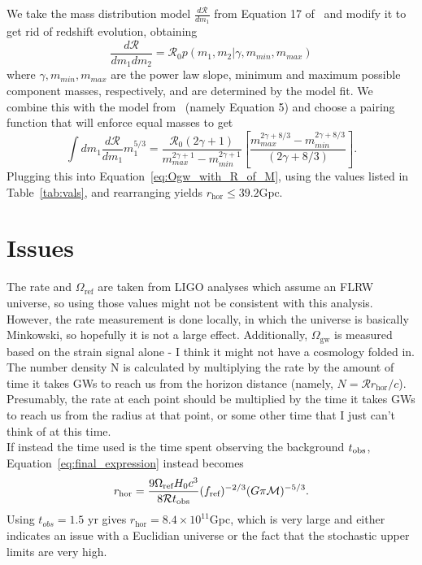 \documentclass[]{article}
\newcommand{\Ogw}{\Omega_{\mathrm{gw}}}
\newcommand{\rhor}{r_{\text{hor}}}
\begin{document}
We take the mass distribution model $\frac{d\mathcal{R}}{dm_1}$ from Equation 17 of~\cite{O2_rates} and modify it to get rid of redshift evolution, obtaining
\begin{equation*}
\frac{d\mathcal{R}}{dm_1 dm_2} = \mathcal{R}_0 p(m_1, m_2 | \gamma, m_{min},m_{max})
\end{equation*}
where $\gamma, m_{min}, m_{max}$ are the power law slope, minimum and maximum possible component masses, respectively, and are determined by the model fit.
We combine this with the model from~\cite{picky_partners} (namely Equation 5) and choose a pairing function that will enforce equal masses to get
\begin{equation*}
\int d m_1 \frac{d\mathcal{R}}{dm_1} m_1 ^{5/3} = \frac{\mathcal{R}_0 (2\gamma +1)}{m_{max}^{2\gamma +1} - m_{min}^{2\gamma +1}} [\frac{m_{max}^{2\gamma +8/3} - m_{min}^{2\gamma +8/3}}{(2\gamma +8/3)}] . 
\end{equation*}
Plugging this into Equation~\ref{eq:Ogw_with_R_of_M}, using the values listed in Table~\ref{tab:vals}, and rearranging yields $\boxed{\rhor \leq 39.2 \mathrm{Gpc}}$. 


\section{Issues}
The rate and $\Omega_{\text{ref}}$ are taken from LIGO analyses which assume an FLRW universe, so using those values might not be consistent with this analysis. 
However, the rate measurement is done locally, in which the universe is basically Minkowski, so hopefully it is not a large effect. 
Additionally, $\Ogw$ is measured based on the strain signal alone - I think it might not have a cosmology folded in.\\

The number density N is calculated by multiplying the rate by the amount of time it takes GWs to reach us from the horizon distance (namely, $N = \mathcal{R} r_{\text{hor}}/c$). Presumably, the rate at each point should be multiplied by the time it takes GWs to reach us from the radius at that point, or some other time that I just can't think of at this time.\\

If instead the time used is the time spent observing the background $t_{\rm obs}$, Equation~\ref{eq:final_expression} instead becomes
\begin{equation}
r_{\text{hor}}=\frac{9\Omega_{\text{ref}} H_0 c^3}{8 \mathcal{R} t_{\rm obs}} (f_{\text{ref}})^{-2/3} ( G \pi \mathcal{M})^{-5/3} .
\end{equation}
Using $t_{obs} = 1.5$ yr gives $r_{\text{hor}} = 8.4 \times 10^{11}$Gpc, which is very large and either indicates an issue with a Euclidian universe or the fact that the stochastic upper limits are very high.
\end{document}
